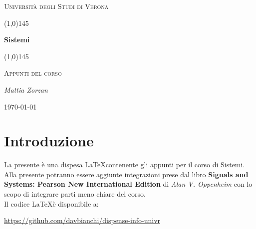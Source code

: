\documentclass{article}
\begin{document}
    \clearpage

    \begin{titlepage}
       \centering
       \vspace*{\fill}
       {\scshape\LARGE Università degli Studi di Verona \par}
       \vspace{1.5cm}
       \line(1,0){145} \\
       {\huge\bfseries Sistemi\par}
       \line(1,0){145} \\
       \vspace{0.5cm}
       {\scshape\Large Appunti del corso\par}
       \vspace{2cm}
       {\Large\itshape Mattia Zorzan\par}
       \vspace{1cm}

       \vspace{5cm}
       \vspace*{\fill}
       {\large \today\par}
    \end{titlepage}
    \thispagestyle{empty}

    \tableofcontents

    \newpage

    \section{Introduzione}
        La presente è una dispesa \LaTeX contenente gli appunti per il corso di Sistemi. Alla presente potranno essere aggiunte integrazioni prese dal libro \textbf{Signals and Systems: Pearson New International Edition} di \textit{Alan V. Oppenheim} con lo scopo di integrare parti meno chiare del corso. \\
        Il codice \LaTeX è disponibile a:

        \begin{center}
            \url{https://github.com/davbianchi/dispense-info-univr}
        \end{center}

    \newpage
\end{document}
